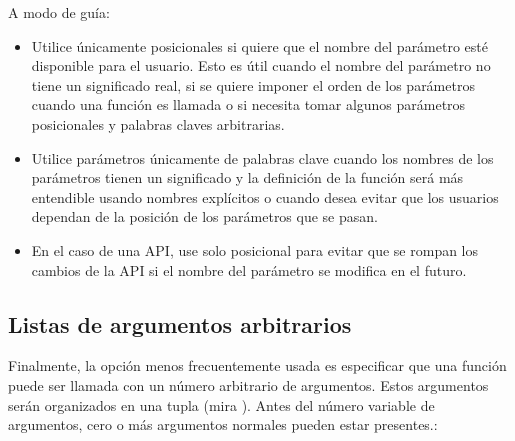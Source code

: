 \documentclass[a4,10pt,spanish]{sphinxmanual}
\begin{document}
\sphinxAtStartPar
A modo de guía:
\begin{itemize}
\item {} 
\sphinxAtStartPar
Utilice únicamente posicionales si quiere que el nombre del parámetro esté disponible para el usuario. Esto es útil cuando el nombre del parámetro no tiene un significado real, si se quiere imponer el orden de los parámetros cuando una función es llamada o si necesita tomar algunos parámetros posicionales y palabras claves arbitrarias.

\item {} 
\sphinxAtStartPar
Utilice parámetros únicamente de palabras clave cuando los nombres de los parámetros tienen un significado y la definición de la función será más entendible usando nombres explícitos o cuando desea evitar que los usuarios dependan de la posición de los parámetros que se pasan.

\item {} 
\sphinxAtStartPar
En el caso de una API, use solo posicional para evitar que se rompan los cambios de la API si el nombre del parámetro se modifica en el futuro.

\end{itemize}


\subsection{Listas de argumentos arbitrarios}
\label{\detokenize{tutorial/controlflow:arbitrary-argument-lists}}\label{\detokenize{tutorial/controlflow:tut-arbitraryargs}}
\ignorespaces 
\sphinxAtStartPar
Finalmente, la opción menos frecuentemente usada es especificar que una función puede ser llamada con un número arbitrario de argumentos. Estos argumentos serán organizados en una tupla (mira {\hyperref[\detokenize{tutorial/datastructures:tut-tuples}]{}}). Antes del número variable de argumentos, cero o más argumentos normales pueden estar presentes.:

\begin{sphinxVerbatim}[commandchars=\\\{\}]
   
\end{sphinxVerbatim}
\end{document}
